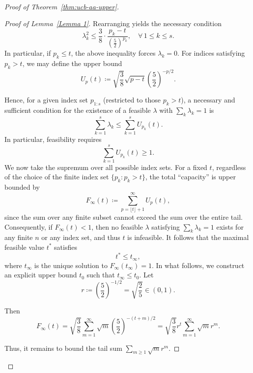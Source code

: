 \documentclass[
  12pt]{article}
\begin{document}
\begin{proof}[Proof of Theorem~\ref{thm:ucb-aa-upper}]
\begin{itemize}
\begin{itemize}
\begin{proof}[Proof of Lemma~\ref{Lemma 1}]
Rearranging yields the necessary condition
\[
\lambda_k^2 \leq \frac{3}{8} \cdot \frac{p_k - t}{\left( \frac{5}{2} \right)^{p_k}}, \quad \forall\, 1\leq k\leq s.
\]
In particular, if \( p_k \leq t \), the above inequality forces \( \lambda_k = 0 \). For indices satisfying \( p_k > t \), we may define the upper bound
\[
U_p(t) \coloneqq \sqrt{\frac{3}{8}} \sqrt{p - t} \left( \frac{5}{2} \right)^{-p/2}.
\]

Hence, for a given index set \( p_{1:s} \) (restricted to those \( p_k > t \)), a necessary and sufficient condition for the existence of a feasible \( \lambda \) with \( \sum_k \lambda_k = 1 \) is
\[
\sum_{k=1}^s \lambda_k \leq \sum_{k=1}^s U_{p_k}(t).
\]
In particular, feasibility requires
\[
\sum_{k=1}^s U_{p_k}(t) \geq 1.
\]
We now take the supremum over all possible index sets. For a fixed \( t \), regardless of the choice of the finite index set \( \{p_k : p_k > t\} \), the total ``capacity'' is upper bounded by
\[
F_\infty(t) \coloneqq \sum_{p = \lfloor t \rfloor + 1}^\infty U_p(t),
\]
since the sum over any finite subset cannot exceed the sum over the entire tail. Consequently, if \( F_\infty(t) < 1 \), then no feasible \( \lambda \) satisfying \( \sum_k \lambda_k = 1 \) exists for any finite \( n \) or any index set, and thus \( t \) is infeasible. It follows that the maximal feasible value \( t^* \) satisfies
\[
t^* \leq t_\infty,
\]
where \( t_\infty \) is the unique solution to \( F_\infty(t_\infty) = 1 \). In what follows, we construct an explicit upper bound \( t_0 \) such that \( t_\infty \leq t_0 \). Let
\[
r \coloneqq \left( \frac{5}{2} \right)^{-1/2} = \sqrt{\frac{2}{5}} \in (0,1).
\]

Then
\[
F_\infty(t) = \sqrt{\frac{3}{8}} \sum_{m=1}^\infty \sqrt{m} \left( \frac{5}{2} \right)^{-(t+m)/2} = \sqrt{\frac{3}{8}} r^t \sum_{m=1}^\infty \sqrt{m} r^m.
\]

Thus, it remains to bound the tail sum \( \sum_{m \geq 1} \sqrt{m} r^m \).


\end{proof}
\end{itemize}
\end{itemize}
\end{proof}
\end{document}
